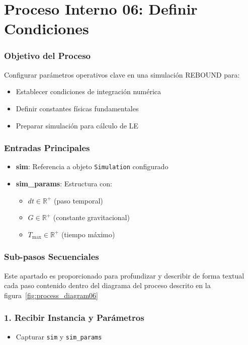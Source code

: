 \section*{Proceso Interno 06: Definir Condiciones}

\subsubsection{Objetivo del Proceso}
Configurar parámetros operativos clave en una simulación REBOUND para:
\begin{itemize}
    \item Establecer condiciones de integración numérica
    \item Definir constantes físicas fundamentales
    \item Preparar simulación para cálculo de LE
\end{itemize}

\subsubsection{Entradas Principales}
\begin{itemize}
    \item \textbf{sim}: Referencia a objeto \texttt{Simulation} configurado
    \item \textbf{sim\_params}: Estructura con:
    \begin{itemize}
        \item $dt \in \mathbb{R}^+$ (paso temporal)
        \item $G \in \mathbb{R}^+$ (constante gravitacional)
        \item $T_{\text{max}} \in \mathbb{R}^+$ (tiempo máximo)
    \end{itemize}
\end{itemize}

\subsubsection{Sub-pasos Secuenciales}
Este apartado es proporcionado para profundizar y describir de forma textual cada paso contenido dentro del diagrama del proceso descrito en la figura~\ref{fig:process_diagram06}
\subsubsection*{1. Recibir Instancia y Parámetros}
\begin{itemize}
    \item Capturar \texttt{sim} y \texttt{sim\_params}
\end{itemize}

